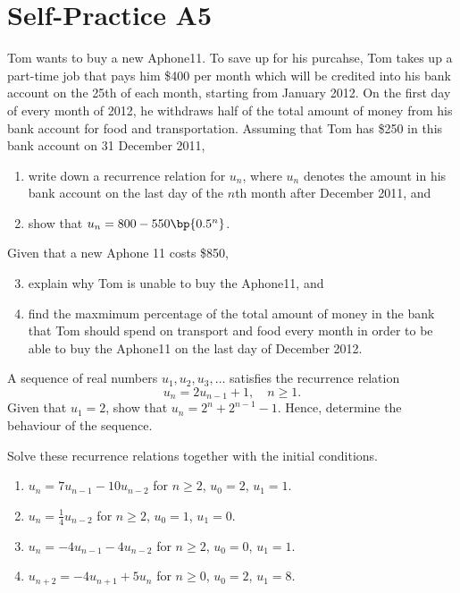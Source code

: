 \section{Self-Practice A5}

\begin{problem}
    Tom wants to buy a new Aphone11. To save up for his purcahse, Tom takes up a part-time job that pays him \$400 per month which will be credited into his bank account on the 25th of each month, starting from January 2012. On the first day of every month of 2012, he withdraws half of the total amount of money from his bank account for food and transportation. Assuming that Tom has \$250 in this bank account on 31 December 2011,
    \begin{enumerate}
        \item write down a recurrence relation for $u_n$, where $u_n$ denotes the amount in his bank account on the last day of the $n$th month after December 2011, and
        \item show that $u_n = 800 - 550\bp{0.5^n}$.
    \end{enumerate}
    Given that a new Aphone 11 costs \$850,
    \begin{enumerate}
        \setcounter{enumi}{2}
        \item explain why Tom is unable to buy the Aphone11, and
        \item find the maxmimum percentage of the total amount of money in the bank that Tom should spend on transport and food every month in order to be able to buy the Aphone11 on the last day of December 2012.
    \end{enumerate}
\end{problem}

\begin{problem}
    A sequence of real numbers $u_1, u_2, u_3, \dots$ satisfies the recurrence relation \[u_n = 2u_{n-1} + 1, \quad n \geq 1.\] Given that $u_1 = 2$, show that $u_n = 2^n + 2^{n-1} - 1$. Hence, determine the behaviour of the sequence.
\end{problem}

\begin{problem}
    Solve these recurrence relations together with the initial conditions.

    \begin{enumerate}
        \item $u_n = 7u_{n-1} - 10u_{n-2}$ for $n \geq 2$, $u_0 = 2$, $u_1 = 1$.
        \item $u_n = \frac14 u_{n-2}$ for $n \geq 2$, $u_0 = 1$, $u_1 = 0$.
        \item $u_n = -4u_{n-1} - 4u_{n-2}$ for $n \geq 2$, $u_0 = 0$, $u_1 = 1$.
        \item $u_{n+2} = -4u_{n+1} + 5u_n$ for $n \geq 0$, $u_0 = 2$, $u_1 = 8$.
    \end{enumerate}
\end{problem}

